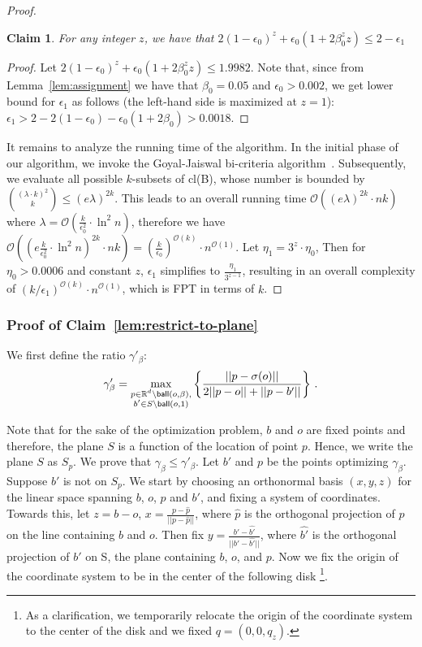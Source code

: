 \documentclass[11pt]{article}
\newtheorem{claim}{Claim}[section]
\newcommand{\ball}{{\sf ball}}
\newcommand{\fpt}{\textsf{FPT}\xspace}
\newcommand{\bR}{\ensuremath{\mathbb{R}}\xspace}
\newcommand{\bigO}[1]{\ensuremath{\mathcal{O}\left(#1\right)}}
\begin{document}
\begin{proof}
\begin{claim}
\label{claim:kzs}
 For any integer $z$, we have that $2(1-\epsilon_0)^z+\epsilon_0(1+2\beta_0^zz)\leq 2 -\epsilon_1$
\end{claim}
\begin{proof}
 Let $2(1-\epsilon_0)^z+\epsilon_0(1+2\beta_0^zz)\leq1.9982$.
Note that, since from Lemma~\ref{lem:assignment} we have that $\beta_0 = 0.05$ and $\epsilon_0>0.002$,  we get lower bound for $\epsilon_1$ as follows (the left-hand side is maximized at $z = 1$): $\epsilon_1 > 2- 2(1- \epsilon_0)- \epsilon_0(1+2\beta_0) >0.0018$.
\end{proof}
It remains to analyze the running time of the algorithm. In the initial phase of our algorithm, we invoke the Goyal-Jaiswal bi-criteria algorithm~\cite{goyal2021tight}. Subsequently, we evaluate all possible $k$-subsets of {\sf cl}(B), whose number is bounded by $\binom{(\lambda \cdot k )^2}{k} \leq (e \lambda)^{2k}$. This leads to an overall running time $\bigO {(e \lambda )^{2k}\cdot nk}$ where  $\lambda= \bigO{\frac{k}{\epsilon_0^2}\cdot \ln^2 n}$, therefore we have $\bigO{(e\frac{k}{\epsilon_0^2}\cdot \ln^2 n)^{2k} \cdot nk} = (\frac{k}{\epsilon_0})^{\bigO {k}} \cdot  n^{\bigO{1}} $. Let $\eta_1 = 3^z \cdot \eta_0$, Then for $\eta_0 > 0.0006$ and constant $z$, $\epsilon_1$ simplifies to $\frac{\eta_1}{3^{z-1}}$, resulting in an overall complexity of $(k/\epsilon_1)^{\bigO {k}} \cdot n^{\bigO{1}}$, which is \fpt in terms of $k$.


\end{proof}

\subsubsection{Proof of Claim~\ref{lem:restrict-to-plane}}\label{ss: lem plane}
We first define the ratio $\gamma'_\beta$:
\begin{equation*}\label{eq:displacement-ratio1}
 \gamma'_\beta = \max_{\substack{p\in \bR^d \backslash \ball(o, \beta),\\ b'\in S\setminus\ball(o,1) }} \left \{ \frac{||p-\sigma(o)||}{2||p - o|| + ||p - b'||} \right\}\,.
 \end{equation*}

Note that for the sake of the optimization problem, $b$ and $o$ are fixed points and therefore, the plane $S$ is a function of the location of point $p$. Hence, we write the plane $S$ as $S_p$.
We prove that $\gamma_\beta \leq \gamma'_\beta$. Let $b'$ and $p$ be the points optimizing $\gamma_\beta$. Suppose $b'$ is not on $S_p$.  We start by choosing an orthonormal basis $(x,y,z)$ for the linear space spanning $b$, $o$, $p$ and $b'$, and fixing a system of coordinates. Towards this, let $z = b-o$, $x = \frac{p-\hat{p}}{||p-\hat{p}||}$, where $\hat{p}$ is the orthogonal projection of $p$ on the line containing $b$ and $o$. Then fix $y = \frac{b'-\hat{b'}}{||b'-\hat{b'}||}$, where $\hat{b'}$ is the orthogonal projection of $b'$ on S,  the plane containing $b$, $o$, and $p$. Now we fix the origin of the coordinate system to be in the center of the following disk \footnote{As a clarification, we temporarily relocate the origin of the coordinate system to the center of the disk and we fixed $q=(0,0,q_z)$.}.
\end{document}
